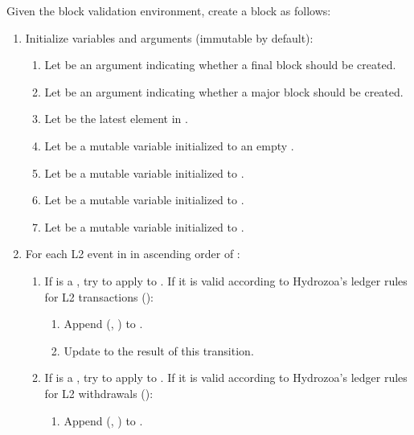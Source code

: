 \documentclass[../hydrozoa.tex]{subfiles}
\begin{document}
Given the block validation environment, create a block as follows:
\begin{enumerate}
  \item Initialize variables and arguments (immutable by default):
    \begin{enumerate}
      \item Let  be an argument indicating whether a final block should be created.
      \item Let  be an argument indicating whether a major block should be created.
      \item Let  be the latest element in .
      \item Let  be a mutable variable initialized to an empty .
      \item Let  be a mutable variable initialized to .
      \item Let  be a mutable variable initialized to .
      \item Let  be a mutable variable initialized to .
    \end{enumerate}
  \item For each L2 event  in  in ascending order of :
      \begin{enumerate}
        \item If  is a , try to apply  to .
          If it is valid according to Hydrozoa's ledger rules for L2 transactions ():
          \begin{enumerate}
            \item Append (, ) to .
            \item Update  to the result of this transition.
          \end{enumerate}
        \item If  is a , try to apply  to .
          If it is valid according to Hydrozoa's ledger rules for L2 withdrawals ():
          \begin{enumerate}
            \item Append (, ) to .

\end{enumerate}
\end{enumerate}
\end{enumerate}
\end{document}
